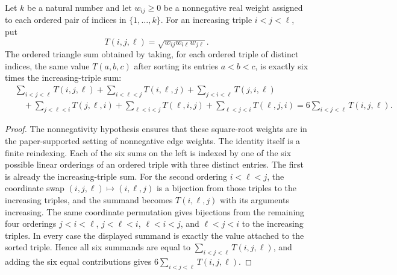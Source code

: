 \begin{helper}
Let $k$ be a natural number and let $w_{ij}\ge 0$ be a nonnegative real
weight assigned to each ordered pair of indices in $\{1,\ldots,k\}$.  For an
increasing triple $i<j<\ell$, put
\[
T(i,j,\ell)=\sqrt{w_{ij}w_{i\ell}w_{j\ell}}.
\]
The ordered triangle sum obtained by taking, for each ordered triple of
distinct indices, the same value $T(a,b,c)$ after sorting its entries
$a<b<c$, is exactly six times the increasing-triple sum:
\[
\begin{aligned}
&\sum_{i<j<\ell}T(i,j,\ell)
+\sum_{i<\ell<j}T(i,\ell,j)
+\sum_{j<i<\ell}T(j,i,\ell)\\
&\quad
+\sum_{j<\ell<i}T(j,\ell,i)
+\sum_{\ell<i<j}T(\ell,i,j)
+\sum_{\ell<j<i}T(\ell,j,i)
=
6\sum_{i<j<\ell}T(i,j,\ell).
\end{aligned}
\]
\end{helper}
\begin{proof}
The nonnegativity hypothesis ensures that these square-root weights are in
the paper-supported setting of nonnegative edge weights.  The identity itself
is a finite reindexing.  Each of the six sums on the left is indexed by one of the six possible
linear orderings of an ordered triple with three distinct entries.  The
first is already the increasing-triple sum.  For the second ordering
$i<\ell<j$, the coordinate swap $(i,j,\ell)\mapsto(i,\ell,j)$ is a bijection
from those triples to the increasing triples, and the summand becomes
$T(i,\ell,j)$ with its arguments increasing.  The same coordinate
permutation gives bijections from the remaining four orderings
$j<i<\ell$, $j<\ell<i$, $\ell<i<j$, and $\ell<j<i$ to the increasing triples.
In every case the displayed summand is exactly the value attached to the
sorted triple.  Hence all six summands are equal to
$\sum_{i<j<\ell}T(i,j,\ell)$, and adding the six equal contributions gives
$6\sum_{i<j<\ell}T(i,j,\ell)$.
\end{proof}
